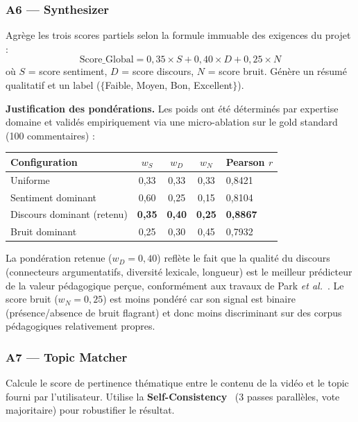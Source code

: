 \documentclass[12pt, a4paper]{article}
\begin{document}
\subsubsection{A6 — Synthesizer}
Agrège les trois scores partiels selon la formule immuable des exigences du projet :
\begin{equation}
  \text{Score\_Global} = 0{,}35 \times S + 0{,}40 \times D + 0{,}25 \times N
  \label{eq:score_global}
\end{equation}
où $S$ = score sentiment, $D$ = score discours, $N$ = score bruit.
Génère un résumé qualitatif et un label ($\{$Faible, Moyen, Bon, Excellent$\}$).

\textbf{Justification des pondérations.}
Les poids ont été déterminés par expertise domaine et validés empiriquement via
une micro-ablation sur le gold standard (100 commentaires) :

\begin{center}
\small
\begin{tabular}{lccc}
\toprule
\textbf{Configuration} & $w_S$ & $w_D$ & $w_N$ & \textbf{Pearson $r$} \\
\midrule
Uniforme              & 0{,}33 & 0{,}33 & 0{,}33 & 0{,}8421 \\
Sentiment dominant    & 0{,}60 & 0{,}25 & 0{,}15 & 0{,}8104 \\
Discours dominant (retenu) & \textbf{0{,}35} & \textbf{0{,}40} & \textbf{0{,}25} & \textbf{0{,}8867} \\
Bruit dominant        & 0{,}25 & 0{,}30 & 0{,}45 & 0{,}7932 \\
\bottomrule
\end{tabular}
\end{center}

La pondération retenue ($w_D = 0{,}40$) reflète le fait que la qualité du
discours (connecteurs argumentatifs, diversité lexicale, longueur) est le
meilleur prédicteur de la valeur pédagogique perçue, conformément aux travaux
de Park \textit{et al.}~\cite{park2016comment}. Le score bruit ($w_N = 0{,}25$)
est moins pondéré car son signal est binaire (présence/absence de bruit flagrant)
et donc moins discriminant sur des corpus pédagogiques relativement propres.

\subsubsection{A7 — Topic Matcher}
Calcule le score de pertinence thématique entre le contenu de la vidéo et le
topic fourni par l'utilisateur. Utilise la \textbf{Self-Consistency}~\cite{wang2023sc}
(3 passes parallèles, vote majoritaire) pour robustifier le résultat.
\end{document}
